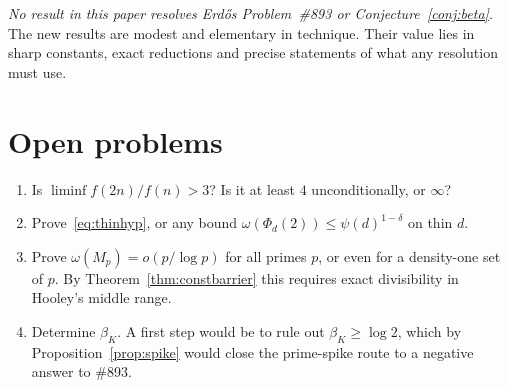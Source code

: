 \documentclass[11pt]{amsart}
\theoremstyle{definition}
\theoremstyle{remark}
\begin{document}
\emph{No result in this paper resolves Erd\H{o}s Problem~\#893 or Conjecture~\ref{conj:beta}.}
The new results are modest and elementary in technique. Their value lies in sharp constants, exact reductions and
precise statements of what any resolution must use.

\section{Open problems}
\begin{enumerate}
\item Is $\liminf f(2n)/f(n)>3$? Is it at least $4$ unconditionally, or $\infty$?
\item Prove~\eqref{eq:thinhyp}, or any bound $\omega(\Phi_d(2))\le\psi(d)^{1-\delta}$ on thin $d$.
\item Prove $\omega(M_p)=o(p/\log p)$ for all primes $p$, or even for a density-one set of $p$. By
Theorem~\ref{thm:constbarrier} this requires exact divisibility in Hooley's middle range.
\item Determine $\beta_K$. A first step would be to rule out $\beta_K\ge\log2$, which by Proposition~\ref{prop:spike}
would close the prime-spike route to a negative answer to \#893.
\end{enumerate}
\end{document}
